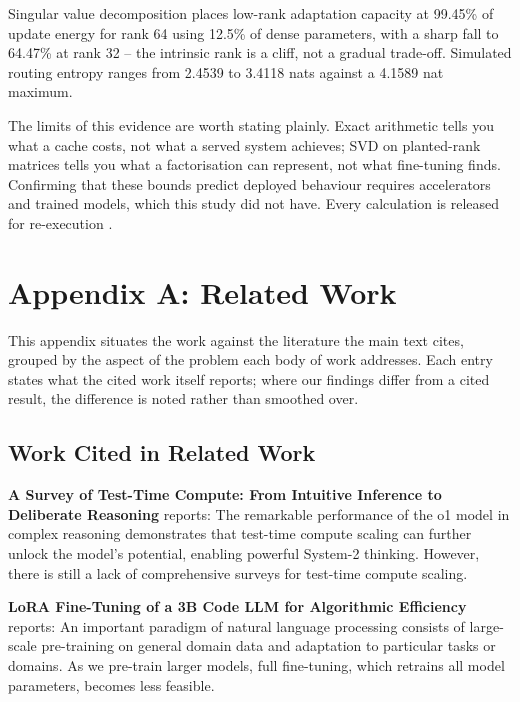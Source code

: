 \documentclass[10pt,twocolumn,letterpaper]{article}
\begin{document}
Singular value decomposition places low-rank adaptation capacity at 99.45\% of update energy for rank 64 using 12.5\% of dense parameters, with a sharp fall to 64.47\% at rank 32 -- the intrinsic rank is a cliff, not a gradual trade-off. Simulated routing entropy ranges from 2.4539 to 3.4118 nats against a 4.1589 nat maximum.

The limits of this evidence are worth stating plainly. Exact arithmetic tells you what a cache costs, not what a served system achieves; SVD on planted-rank matrices tells you what a factorisation can represent, not what fine-tuning finds. Confirming that these bounds predict deployed behaviour requires accelerators and trained models, which this study did not have. Every calculation is released for re-execution \cite{arxiv_2406_00584,crossref_10_1201_9788743808145_14}.





\section{Appendix A: Related Work}


This appendix situates the work against the literature the main text cites, grouped by the aspect of the problem each body of work addresses. Each entry states what the cited work itself reports; where our findings differ from a cited result, the difference is noted rather than smoothed over.


\subsection{Work Cited in Related Work}


\textbf{A Survey of Test-Time Compute: From Intuitive Inference to Deliberate Reasoning} \cite{arxiv_2501_02497} reports: The remarkable performance of the o1 model in complex reasoning demonstrates that test-time compute scaling can further unlock the model's potential, enabling powerful System-2 thinking. However, there is still a lack of comprehensive surveys for test-time compute scaling.

\textbf{LoRA Fine-Tuning of a 3B Code LLM for Algorithmic Efficiency} \cite{crossref_10_48550_arxiv_2106_09685} reports: An important paradigm of natural language processing consists of large-scale pre-training on general domain data and adaptation to particular tasks or domains. As we pre-train larger models, full fine-tuning, which retrains all model parameters, becomes less feasible.
\end{document}

